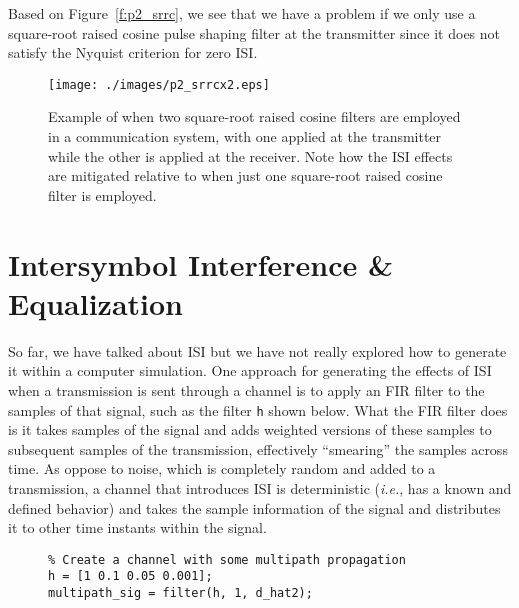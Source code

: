\documentclass[letterpaper,12pt]{article}
\begin{document}
Based on Figure~\ref{f:p2_srrc}, we see that we have a problem if we only use a square-root raised cosine pulse shaping filter at the transmitter since it does not satisfy the Nyquist criterion for zero ISI.


\begin{figure}[h]
 \centering
 \texttt{[image: ./images/p2\_srrcx2.eps]}
 \caption{Example of when two square-root raised cosine filters are employed in a communication system, with one applied at the transmitter while the other is applied at the receiver.  Note how the ISI effects are mitigated relative to when just one square-root raised cosine filter is employed.}\label{f:p2_srrcx2}
\end{figure}

\section{Intersymbol Interference \& Equalization}

So far, we have talked about ISI but we have not really explored how to generate it within a computer simulation.  One approach for generating the effects of ISI when a transmission is sent through a channel is to
apply an FIR filter to the samples of that signal, such as the filter \texttt{h} shown below.  What the FIR filter does is it takes samples of the signal and adds weighted versions of these samples to subsequent samples of the 
transmission, effectively ``smearing'' the samples across time.  As oppose to noise, which is completely random and added to a transmission, a channel that introduces ISI is deterministic (\textit{i.e.}, has a known and defined behavior)
and takes the sample information of the signal and distributes it to other time instants within the signal.
\begin{figure}[h]
\centering
\begin{minipage}[framed]{0.9\textwidth}
\begin{lstlisting}
% Create a channel with some multipath propagation
h = [1 0.1 0.05 0.001];
multipath_sig = filter(h, 1, d_hat2);
\end{lstlisting}
\end{minipage}
\captionsetup{labelformat=empty}
\end{figure}
\end{document}
